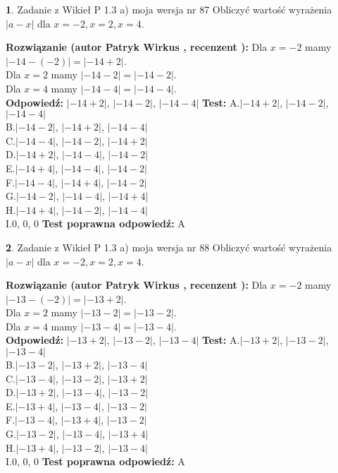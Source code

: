 \documentclass[12pt, a4paper]{article}
\theoremstyle{definition} %
\newtheorem{zad}{}
\newcommand{\zadStart}[1]{\begin{zad}#1\newline}
\newcommand{\zadStop}{\end{zad}}
\newcommand{\rozwStart}[2]{\noindent \textbf{Rozwiązanie (autor #1 , recenzent #2): }\newline}
\newcommand{\rozwStop}{\newline}
\newcommand{\odpStart}{\noindent \textbf{Odpowiedź:}\newline}
\newcommand{\odpStop}{\newline}
\newcommand{\testStart}{\noindent \textbf{Test:}\newline}
\newcommand{\testStop}{\newline}
\newcommand{\kluczStart}{\noindent \textbf{Test poprawna odpowiedź:}\newline}
\newcommand{\kluczStop}{\newline}
\begin{document}
\zadStart{Zadanie z Wikieł P 1.3 a) moja wersja nr 87}
Obliczyć wartość wyrażenia $|a - x|$ dla $x=-2,x=2,x=4$.
\zadStop
\rozwStart{Patryk Wirkus}{}
Dla $x = -2$ mamy $|-14 - (-2)| = |-14 + 2|$.\\
Dla $x = 2$ mamy $|-14 - 2| = |-14 - 2|$.\\
Dla $x = 4$ mamy $|-14 - 4| = |-14 - 4|$.\\
\rozwStop
\odpStart
$|-14 + 2|$, $|-14 - 2|$, $|-14 - 4|$
\odpStop
\testStart
A.$|-14 + 2|$, $|-14 - 2|$, $|-14 - 4|$\\
B.$|-14 - 2|$, $|-14 + 2|$, $|-14 - 4|$\\
C.$|-14 - 4|$, $|-14 - 2|$, $|-14 + 2|$\\
D.$|-14 + 2|$, $|-14 - 4|$, $|-14 - 2|$\\
E.$|-14 + 4|$, $|-14 - 4|$, $|-14 - 2|$\\
F.$|-14 - 4|$, $|-14 + 4|$, $|-14 - 2|$\\
G.$|-14 - 2|$, $|-14 - 4|$, $|-14 + 4|$\\
H.$|-14 + 4|$, $|-14 - 2|$, $|-14 - 4|$\\
I.$0$, $0$, $0$
\testStop
\kluczStart
A
\kluczStop



\zadStart{Zadanie z Wikieł P 1.3 a) moja wersja nr 88}
Obliczyć wartość wyrażenia $|a - x|$ dla $x=-2,x=2,x=4$.
\zadStop
\rozwStart{Patryk Wirkus}{}
Dla $x = -2$ mamy $|-13 - (-2)| = |-13 + 2|$.\\
Dla $x = 2$ mamy $|-13 - 2| = |-13 - 2|$.\\
Dla $x = 4$ mamy $|-13 - 4| = |-13 - 4|$.\\
\rozwStop
\odpStart
$|-13 + 2|$, $|-13 - 2|$, $|-13 - 4|$
\odpStop
\testStart
A.$|-13 + 2|$, $|-13 - 2|$, $|-13 - 4|$\\
B.$|-13 - 2|$, $|-13 + 2|$, $|-13 - 4|$\\
C.$|-13 - 4|$, $|-13 - 2|$, $|-13 + 2|$\\
D.$|-13 + 2|$, $|-13 - 4|$, $|-13 - 2|$\\
E.$|-13 + 4|$, $|-13 - 4|$, $|-13 - 2|$\\
F.$|-13 - 4|$, $|-13 + 4|$, $|-13 - 2|$\\
G.$|-13 - 2|$, $|-13 - 4|$, $|-13 + 4|$\\
H.$|-13 + 4|$, $|-13 - 2|$, $|-13 - 4|$\\
I.$0$, $0$, $0$
\testStop
\kluczStart
A
\kluczStop
\end{document}
